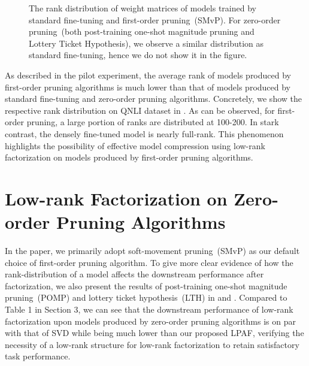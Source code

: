 	
	\begin{figure}[h]
		\centering
		\caption{The rank distribution of weight matrices of models trained by standard fine-tuning and first-order pruning~(SMvP). For zero-order pruning~(both post-training one-shot magnitude pruning and Lottery Ticket Hypothesis), we observe a similar distribution as standard fine-tuning, hence we do not show it in the figure.}
		\label{fig:rank}
	\end{figure}
	As described in the pilot experiment, the average rank of models produced by first-order pruning algorithms is much lower than that of models produced by standard fine-tuning and zero-order pruning algorithms. Concretely, we show the respective rank distribution on QNLI dataset in . As can be observed, for first-order pruning,  a large portion of ranks are distributed at 100-200. In stark contrast, the densely fine-tuned model is nearly full-rank. This phenomenon highlights the possibility of effective model compression using low-rank factorization on models produced by first-order pruning algorithms.
	
	
	
	
	\section{Low-rank Factorization on Zero-order Pruning Algorithms}
	\label{sec:appendixB}
	
	
	In the paper, we primarily adopt soft-movement pruning~(SMvP) as our default choice of first-order pruning algorithm. To give more clear evidence of how the rank-distribution of a model affects the downstream performance after factorization, we also present the results of post-training one-shot magnitude pruning~(POMP) and lottery ticket hypothesis~(LTH) in  and . Compared to Table 1 in Section 3, we can see that the downstream performance of low-rank factorization upon models produced by zero-order pruning algorithms is on par with that of SVD while being much lower than our proposed LPAF, verifying the necessity of a low-rank structure for low-rank factorization to retain satisfactory task performance.
	
